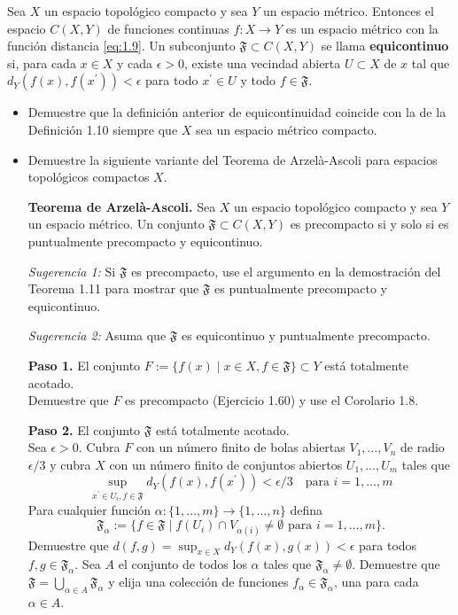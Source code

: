 \begin{exercise}\label{ex:1.15}
Sea $X$ un espacio topológico compacto y sea $Y$ un espacio métrico. Entonces el espacio $C(X,Y)$ de funciones continuas $f:X\rightarrow Y$ es un espacio métrico con la función distancia \eqref{eq:1.9}. Un subconjunto $\mathfrak{F}\subset C(X,Y)$ se llama \textbf{equicontinuo} si, para cada $x\in X$ y cada $\epsilon>0$, existe una vecindad abierta $U\subset X$ de $x$ tal que $d_{Y}(f(x), f(x^{\prime}))<\epsilon$ para todo $x^{\prime}\in U$ y todo $f\in\mathfrak{F}$.
\begin{itemize}
    \item[(a)] Demuestre que la definición anterior de equicontinuidad coincide con la de la Definición 1.10 siempre que $X$ sea un espacio métrico compacto.
    \item[(b)] Demuestre la siguiente variante del Teorema de Arzelà-Ascoli para espacios topológicos compactos $X$.
    
    \textbf{Teorema de Arzelà-Ascoli.} Sea $X$ un espacio topológico compacto y sea $Y$ un espacio métrico. Un conjunto $\mathfrak{F}\subset C(X,Y)$ es precompacto si y solo si es puntualmente precompacto y equicontinuo.
    
    \noindent\textit{Sugerencia 1:} Si $\mathfrak{F}$ es precompacto, use el argumento en la demostración del Teorema 1.11 para mostrar que $\mathfrak{F}$ es puntualmente precompacto y equicontinuo.
    
    \noindent\textit{Sugerencia 2:} Asuma que $\mathfrak{F}$ es equicontinuo y puntualmente precompacto.
    
    \noindent \textbf{Paso 1.} El conjunto $F:=\{f(x) \mid x\in X, f\in\mathfrak{F}\}\subset Y$ está totalmente acotado.
    \\ Demuestre que $F$ es precompacto (Ejercicio 1.60) y use el Corolario 1.8.
    
    \noindent \textbf{Paso 2.} El conjunto $\mathfrak{F}$ está totalmente acotado.
    \\ Sea $\epsilon>0$. Cubra $F$ con un número finito de bolas abiertas $V_{1},\dots,V_{n}$ de radio $\epsilon/3$ y cubra $X$ con un número finito de conjuntos abiertos $U_{1},\dots,U_{m}$ tales que
    \[ \sup_{x^{\prime}\in U_{i}, f\in\mathfrak{F}}d_{Y}(f(x),f(x^{\prime}))<\epsilon/3 \quad \text{para } i=1,\dots,m \]
    Para cualquier función $\alpha:\{1,\dots,m\}\rightarrow\{1,\dots,n\}$ defina
    \[ \mathfrak{F}_{\alpha}:=\{f\in\mathfrak{F} \mid f(U_{i})\cap V_{\alpha(i)}\ne\emptyset \text{ para } i=1,\dots,m\}. \]
    Demuestre que $d(f,g)=\sup_{x\in X}d_{Y}(f(x),g(x))<\epsilon$ para todos $f,g\in\mathfrak{F}_{\alpha}$. Sea $A$ el conjunto de todos los $\alpha$ tales que $\mathfrak{F}_{\alpha}\ne\emptyset$. Demuestre que $\mathfrak{F}=\bigcup_{\alpha\in A}\mathfrak{F}_{\alpha}$ y elija una colección de funciones $f_{\alpha}\in\mathfrak{F}_{\alpha}$, una para cada $\alpha\in A$.
    

\end{itemize}
\end{exercise}

